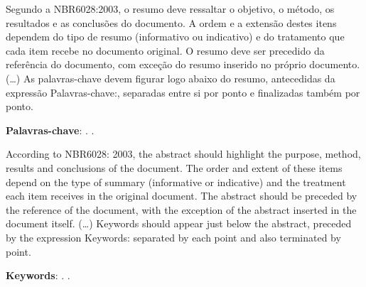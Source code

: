 \setlength{\absparsep}{18pt} %
\begin{resumo}
	Segundo a NBR6028:2003, o resumo deve ressaltar o objetivo, o método, os resultados e as conclusões do documento. A ordem e a extensão destes itens dependem do tipo de resumo (informativo ou indicativo) e do tratamento que cada item recebe no documento original. O resumo deve ser precedido da referência do documento, com exceção do resumo inserido no próprio documento. (\ldots) As palavras-chave devem figurar logo abaixo do resumo, antecedidas da expressão Palavras-chave:, separadas entre si por ponto e finalizadas também por ponto.

	\textbf{Palavras-chave}: \iot{}. \Middleware{}.
\end{resumo}

\begin{resumo}[Abstract]
	According to NBR6028: 2003, the abstract should highlight the purpose, method, results and conclusions of the document. The order and extent of these items depend on the type of summary (informative or indicative) and the treatment each item receives in the original document. The abstract should be preceded by the reference of the document, with the exception of the abstract inserted in the document itself. (\ldots) Keywords should appear just below the abstract, preceded by the expression Keywords: separated by each point and also terminated by point.

	\textbf{Keywords}: \iot{}. \Middleware{}.
\end{resumo}
